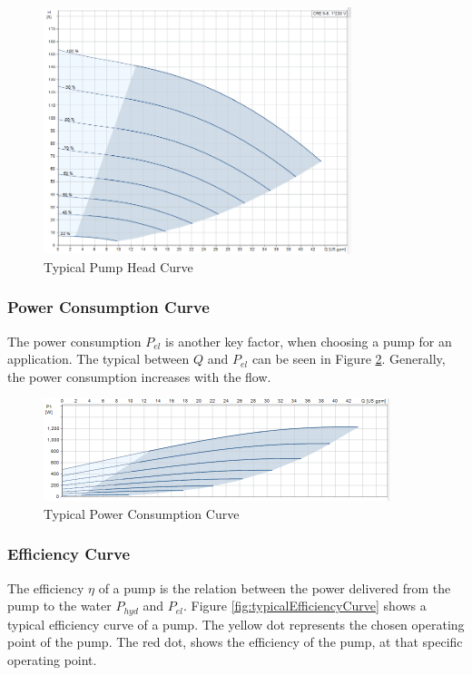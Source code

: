 \begin{figure}[h]
	\centering
	\includegraphics[width=0.8\textwidth]{figures/03physicalSetup/typicalHeadCurve.PNG}
	\caption{Typical Pump Head Curve \cite{PumpPhoto}}
	\label{fig:typicalPumpCurve}
\end{figure}

\subsubsection{Power Consumption Curve}
The power consumption $P_{el}$ is another key factor,
when choosing a pump for an application.
The typical between $Q$ and $P_{el}$ can be seen in Figure \ref{fig:typicalPowerConsumptionCurve}.
Generally, the power consumption increases with the flow.

\begin{figure}[h]
	\centering
	\includegraphics[width=0.9\textwidth]{figures/03physicalSetup/typicalPowerConsumptionCurve.PNG}
	\caption{Typical Power Consumption Curve \cite{PumpPhoto}}
	\label{fig:typicalPowerConsumptionCurve}
\end{figure}

\subsubsection{Efficiency Curve}
The efficiency $\eta$ of a pump is the relation between the power delivered from the pump to the water $P_{hyd}$ and $P_{el}
$.
Figure \ref{fig:typicalEfficiencyCurve} shows a typical efficiency curve of a pump. The yellow dot represents the 
chosen operating point of the pump. The red dot, shows the efficiency of the pump, at that specific operating point.

